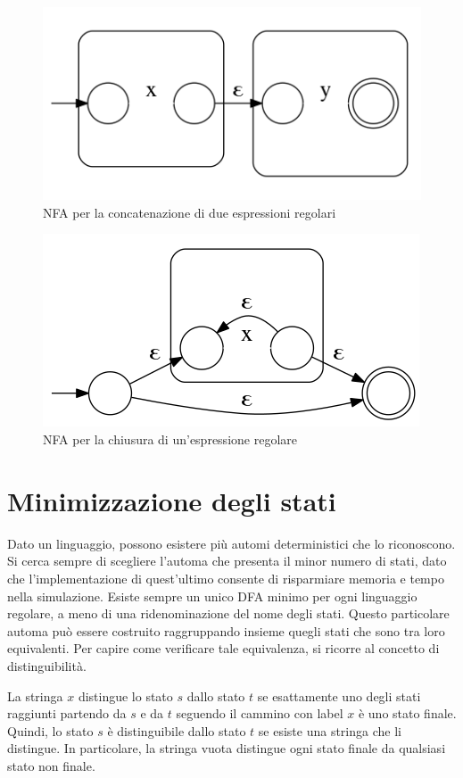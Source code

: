 \begin{figure}[htbp]
\centering
\includegraphics[scale=0.4]{./Img/automi/re_concat.png}
\caption{NFA per la concatenazione di due espressioni regolari}
\label{fig:re_concat}
\end{figure}

\begin{figure}[htbp]
\centering
\includegraphics[scale=0.4]{./Img/automi/re_closure.png}
\caption{NFA per la chiusura di un'espressione regolare}
\label{fig:re_closure}
\end{figure}


\newpage
\section{Minimizzazione degli stati}
Dato un linguaggio, possono esistere più automi deterministici che lo riconoscono. Si cerca sempre di scegliere l'automa che presenta il minor numero di stati, dato che l'implementazione di quest'ultimo consente di risparmiare memoria e tempo nella simulazione. 
Esiste sempre un unico DFA minimo per ogni linguaggio regolare, a meno di una ridenominazione del nome degli stati. Questo particolare automa può essere costruito raggruppando insieme quegli stati che sono tra loro equivalenti. Per capire come verificare tale equivalenza, si ricorre al concetto di distinguibilità.
\begin{defn}
La stringa $x$ distingue lo stato $s$ dallo stato $t$ se esattamente uno degli stati raggiunti partendo da $s$ e da $t$ seguendo il cammino con label $x$ è uno stato finale. Quindi, lo stato $s$ è distinguibile dallo stato $t$ se esiste una stringa che li distingue.
In particolare, la stringa vuota distingue ogni stato finale da qualsiasi stato non finale.
\end{defn}

